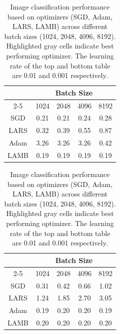 \begin{table}[!t]
\vspace{-5pt}
\small
\vspace{7pt}
\caption{Image classification performance based on optimizers (SGD, Adam, LARS, LAMB) across different batch sizes (1024, 2048, 4096, 8192). Highlighted gray cells indicate best performing optimizer. The learning rate of the top and bottom table are 0.01 and 0.001 respectively.}\label{tbl:img_results}
\vspace{-10pt}
\begin{center}
\begin{tabular}{ c|c|c|c|c}
\multicolumn{1}{c|}{} &  \multicolumn{4}{c}{Batch Size}\\ \cline{2-5}
\multicolumn{1}{c|}{Optimizer} &
 \multicolumn{1}{c|}{1024} &
 \multicolumn{1}{c|}{2048} &
 \multicolumn{1}{c|}{4096} &
 \multicolumn{1}{c}{8192} \\
 \hline
SGD & 0.21 & 0.21 & 0.24 & 0.28 \\
LARS & 0.32 & 0.39 & 0.55 & 0.87 \\
Adam & 3.26 & 3.26 & 3.26 & 0.42 \\
LAMB & \cellcolor{gray!30} 0.19 & \cellcolor{gray!30} 0.19 & \cellcolor{gray!30} 0.19 & \cellcolor{gray!30}  0.19 \\

\end{tabular}

\vspace{10pt}

\begin{tabular}{ c|c|c|c|c}
\multicolumn{1}{c|}{} &  \multicolumn{4}{c}{Batch Size}\\ \cline{2-5}
\multicolumn{1}{c|}{Optimizer} &
 \multicolumn{1}{c|}{1024} &
 \multicolumn{1}{c|}{2048} &
 \multicolumn{1}{c|}{4096} &
 \multicolumn{1}{c}{8192} \\ \hline
SGD & 0.31 & 0.42 & 0.66 & 1.02 \\
LARS & 1.24 & 1.85 & 2.70 & 3.05 \\
Adam & \cellcolor{gray!30} 0.19 & \cellcolor{gray!30} 0.20 & \cellcolor{gray!30} 0.20 & \cellcolor{gray!30} 0.19 \\
LAMB & 0.20 & \cellcolor{gray!30} 0.20 & \cellcolor{gray!30} 0.20 & 0.20 \\

\end{tabular}
\vspace{-15pt}
\end{center}
\end{table}

